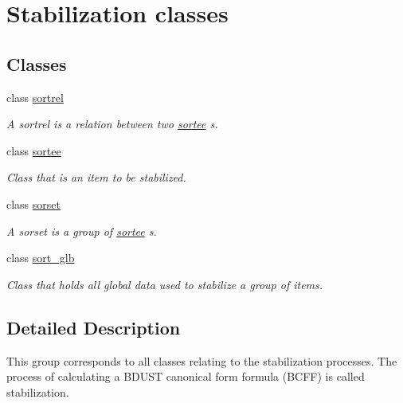 \hypertarget{group__docgrp__stab__classes}{}\section{Stabilization classes}
\label{group__docgrp__stab__classes}
\subsection*{Classes}
\begin{DoxyCompactItemize}
\item 
class \hyperlink{classsortrel}{sortrel}
\begin{DoxyCompactList}\small\item\em A sortrel is a relation between two \hyperlink{classsortee}{sortee} s. \end{DoxyCompactList}\item 
class \hyperlink{classsortee}{sortee}
\begin{DoxyCompactList}\small\item\em Class that is an item to be stabilized. \end{DoxyCompactList}\item 
class \hyperlink{classsorset}{sorset}
\begin{DoxyCompactList}\small\item\em A sorset is a group of \hyperlink{classsortee}{sortee} s. \end{DoxyCompactList}\item 
class \hyperlink{classsort__glb}{sort\+\_\+glb}
\begin{DoxyCompactList}\small\item\em Class that holds all global data used to stabilize a group of items. \end{DoxyCompactList}\end{DoxyCompactItemize}


\subsection{Detailed Description}
This group corresponds to all classes relating to the stabilization processes. The process of calculating a B\+D\+U\+ST canonical form formula (B\+C\+FF) is called stabilization. 